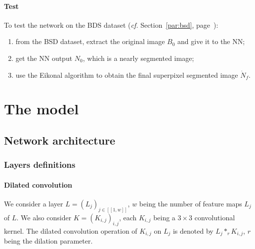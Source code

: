 \documentclass{article}
\begin{document}
        \paragraph{Test}
        To test the network on the BDS dataset (\textit{cf.} Section~\ref{par:bsd}, page~\pageref{par:bsd}):
        \begin{enumerate}
            \item from the BSD dataset, extract the original image $B_0$ and give it to the NN;
            \item get the NN output $N_0$, which is a nearly segmented image;
            \item use the Eikonal algorithm to obtain the final superpixel segmented image $\dot N_f$.
        \end{enumerate}



\section{The model}
    \subsection{Network architecture}
        \subsubsection{Layers definitions}

            \paragraph{Dilated convolution}\label{par:dilated} We consider a layer $L=(L_j)_{j\in [\![1,w]\!]}$, $w$ being the number of feature maps $L_j$ of $L$. We also consider $K=(K_{i,j})_{i,j}$, each $K_{i,j}$ being a $3\times 3$ convolutional kernel. The dilated convolution operation of $K_{i,j}$ on $L_j$ is denoted by $L_j*_r K_{i,j}$, $r$ being the dilation parameter.
\end{document}
